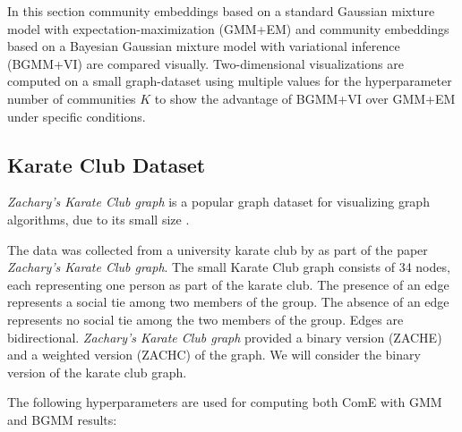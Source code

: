 \documentclass[conference]{IEEEtran}
\begin{document}
In this section community embeddings based on a standard Gaussian mixture model with expectation-maximization (GMM+EM) and community embeddings based on a Bayesian Gaussian mixture model with variational inference (BGMM+VI) are compared visually. Two-dimensional visualizations are computed on a small graph-dataset using multiple values for the hyperparameter number of communities $K$ to show the advantage of BGMM+VI over GMM+EM under specific conditions.

\subsection{Karate Club Dataset}
\label{sec:karate_club}

\textit{Zachary’s Karate Club graph} is a popular graph dataset for visualizing graph algorithms, due to its small size \cite{KarateClubDS}.

The data was collected from a university karate club by \citeauthor{Zachary1977AnIF} as part of the \citeyear{Zachary1977AnIF} paper \textit{Zachary’s Karate Club graph}. The small Karate Club graph consists of 34 nodes, each representing one person as part of the karate club. The presence of an edge represents a social tie among two members of the group. The absence of an edge represents no social tie among the two members of the group. Edges are bidirectional. \textit{Zachary’s Karate Club graph} provided a binary version (ZACHE) and a weighted version (ZACHC) of the graph. We will consider the binary version of the karate club graph.

The following hyperparameters are used for computing both ComE with GMM and BGMM results:
\end{document}
